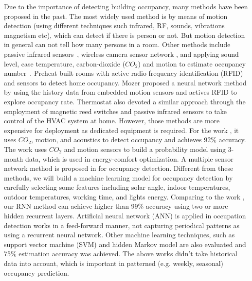 Due to the importance of detecting building occupancy, many methods have been
proposed in the past. The most widely used method is by means of motion
detection (using different techniques such infrared, RF, sounds, vibrations
magnetism etc), which can detect if there is person or not. But motion
detection in general can not tell how many persons in a room.  Other methods
include passive infrared sensors~\cite{Dodier2006Building}, wireless camera
sensor network \cite{erickson2009energy}, and applying sound level, case
temperature, carbon-dioxide ($CO_2$) and motion to estimate occupancy
number~\cite{Ekwevugbe2013Real}.  Preheat \cite{scott2011ctrl} built rooms with
active radio frequency identification (RFID) and sensors to detect home
occupancy. Mozer \cite{mozer1997neurothermostat} proposed a neural network
method by using the history data from embedded motion sensors and actives RFID
to explore occupancy rate. Thermostat \cite{lu2010smartthermostat} also devoted
a similar approach through the employment of magnetic reed switches and passive
infrared sensors to take control of the HVAC system at home. However, those
methods are more expensive for deployment as dedicated equipment is required.
\textcolor{feb18rev}{For the work \cite{dong2014real}, it uses $CO_2$, motion, and acoustics to detect occupancy and achieves 92\% accuracy.
The work \cite{majumdar2014energy} uses $CO_2$ and motion sensors to build a probability model using 3-month data, which is used in energy-comfort optimization. A multiple sensor network method is proposed in \cite{yang2016review} for occupancy detection. Different from these methods, we will build a machine learning model for occupancy detection by carefully selecting some features including solar angle, indoor temperatures, outdoor temperatures, working time, and lights energy. Comparing to the work \cite{dong2014real}, our RNN method can achieve higher than 99\% accuracy using two or more hidden recurrent layers. Artificial neural network (ANN) is applied in occupation detection works
\cite{lam2009occupancy} in a feed-forward manner, not capturing periodical
patterns as using a recurrent neural network. Other machine learning
techniques, such as support vector machine (SVM) and hidden Markov model are
also evaluated and 75\% estimation accuracy was achieved. The above works didn't
take historical data into account, which is important in patterned (e.g.
weekly, seasonal) occupancy prediction.}

